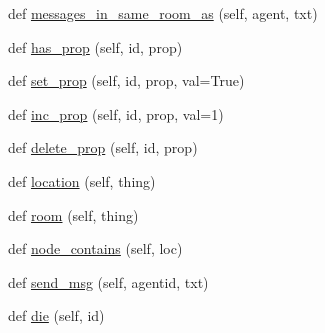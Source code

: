 \begin{DoxyCompactItemize}
\item 
def \hyperlink{classprojects_1_1mastering__the__dungeon_1_1tasks_1_1graph__world2_1_1graph_1_1Graph_acf7515b326c420223c184330ae8dbff4}{messages\+\_\+in\+\_\+same\+\_\+room\+\_\+as} (self, agent, txt)
\item 
def \hyperlink{classprojects_1_1mastering__the__dungeon_1_1tasks_1_1graph__world2_1_1graph_1_1Graph_af002f18d01d8845e6a69ceb7ccc4a89f}{has\+\_\+prop} (self, id, prop)
\item 
def \hyperlink{classprojects_1_1mastering__the__dungeon_1_1tasks_1_1graph__world2_1_1graph_1_1Graph_aea241c8e3a1ac9af2517454c76208ce4}{set\+\_\+prop} (self, id, prop, val=True)
\item 
def \hyperlink{classprojects_1_1mastering__the__dungeon_1_1tasks_1_1graph__world2_1_1graph_1_1Graph_acde814d9a671217a2110d8a0c6039e9b}{inc\+\_\+prop} (self, id, prop, val=1)
\item 
def \hyperlink{classprojects_1_1mastering__the__dungeon_1_1tasks_1_1graph__world2_1_1graph_1_1Graph_ab54da0d36931eb0f546a79f7d5e23883}{delete\+\_\+prop} (self, id, prop)
\item 
def \hyperlink{classprojects_1_1mastering__the__dungeon_1_1tasks_1_1graph__world2_1_1graph_1_1Graph_a1a74b132da5047b1312ac2887b2aa4ae}{location} (self, thing)
\item 
def \hyperlink{classprojects_1_1mastering__the__dungeon_1_1tasks_1_1graph__world2_1_1graph_1_1Graph_a7d58b9a688d3a775f150c7a40a72c11d}{room} (self, thing)
\item 
def \hyperlink{classprojects_1_1mastering__the__dungeon_1_1tasks_1_1graph__world2_1_1graph_1_1Graph_aab5ee706618d10e1936d78943a0431cc}{node\+\_\+contains} (self, loc)
\item 
def \hyperlink{classprojects_1_1mastering__the__dungeon_1_1tasks_1_1graph__world2_1_1graph_1_1Graph_a343a58d79711988b57c6d2b3b1727ef6}{send\+\_\+msg} (self, agentid, txt)
\item 
def \hyperlink{classprojects_1_1mastering__the__dungeon_1_1tasks_1_1graph__world2_1_1graph_1_1Graph_aff30ced8dfe1c7910bdf511f5b7af635}{die} (self, id)
\begin{DoxyCompactList}\small\item\em 


\end{DoxyCompactList}
\end{DoxyCompactItemize}

